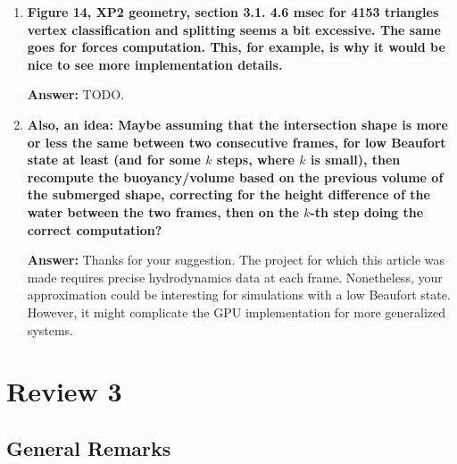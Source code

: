 \documentclass{article}
\newcommand{\answer}[1]{\textbf{\textcolor{answercolor}{Answer:}} \textcolor{answercolor}{#1}}
\begin{document}
\begin{enumerate}[label=\textbf{\arabic*.}]
    \answer{We have added some explanation and three figures to make clarify the desired shape.}

    \item \textbf{Figure 14, XP2 geometry, section 3.1. 4.6 msec for 4153 triangles vertex classification and splitting seems a bit excessive. The same goes for forces computation. This, for example, is why it would be nice to see more implementation details.}
    
    \answer{TODO.}

    \item \textbf{Also, an idea: Maybe assuming that the intersection shape is more or less the same between two consecutive frames, for low Beaufort state at least (and for some $k$ steps, where $k$ is small), then recompute the buoyancy/volume based on the previous volume of the submerged shape, correcting for the height difference of the water between the two frames, then on the $k$-th step doing the correct computation?}
    
    \answer{Thanks for your suggestion. The project for which this article was made requires precise hydrodynamics data at each frame. Nonetheless, your approximation could be interesting for simulations with a low Beaufort state. However, it might complicate the GPU implementation for more generalized systems.}

    
\end{enumerate}

\section*{Review 3}

\subsection*{General Remarks}
\end{document}
